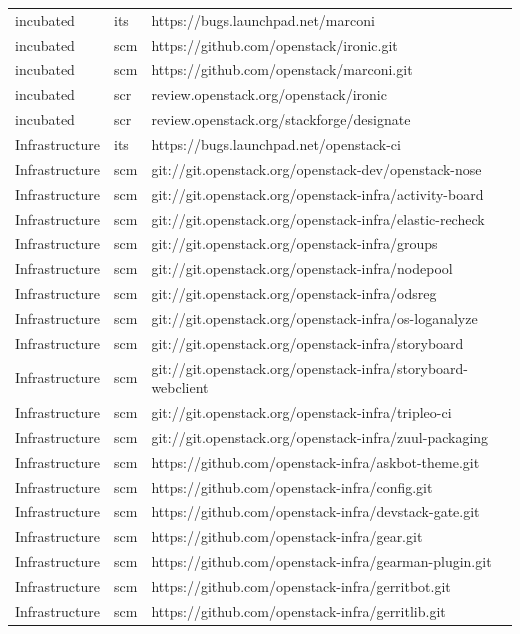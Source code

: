 \documentclass[a4wide,11pt]{report}
\begin{document}
\begin{center}
\begin{longtable}{|p{4cm}|p{1cm}|p{10cm}|}
incubated&its&https://bugs.launchpad.net/marconi\\ 
incubated&scm&https://github.com/openstack/ironic.git\\ 
incubated&scm&https://github.com/openstack/marconi.git\\ 
incubated&scr&review.openstack.org/openstack/ironic\\ 
incubated&scr&review.openstack.org/stackforge/designate\\ 
Infrastructure&its&https://bugs.launchpad.net/openstack-ci\\ 
Infrastructure&scm&git://git.openstack.org/openstack-dev/openstack-nose\\ 
Infrastructure&scm&git://git.openstack.org/openstack-infra/activity-board\\ 
Infrastructure&scm&git://git.openstack.org/openstack-infra/elastic-recheck\\ 
Infrastructure&scm&git://git.openstack.org/openstack-infra/groups\\ 
Infrastructure&scm&git://git.openstack.org/openstack-infra/nodepool\\ 
Infrastructure&scm&git://git.openstack.org/openstack-infra/odsreg\\ 
Infrastructure&scm&git://git.openstack.org/openstack-infra/os-loganalyze\\ 
Infrastructure&scm&git://git.openstack.org/openstack-infra/storyboard\\ 
Infrastructure&scm&git://git.openstack.org/openstack-infra/storyboard-webclient\\ 
Infrastructure&scm&git://git.openstack.org/openstack-infra/tripleo-ci\\ 
Infrastructure&scm&git://git.openstack.org/openstack-infra/zuul-packaging\\ 
Infrastructure&scm&https://github.com/openstack-infra/askbot-theme.git\\ 
Infrastructure&scm&https://github.com/openstack-infra/config.git\\ 
Infrastructure&scm&https://github.com/openstack-infra/devstack-gate.git\\ 
Infrastructure&scm&https://github.com/openstack-infra/gear.git\\ 
Infrastructure&scm&https://github.com/openstack-infra/gearman-plugin.git\\ 
Infrastructure&scm&https://github.com/openstack-infra/gerritbot.git\\ 
Infrastructure&scm&https://github.com/openstack-infra/gerritlib.git\\ 

\end{longtable}
\end{center}
\end{document}
